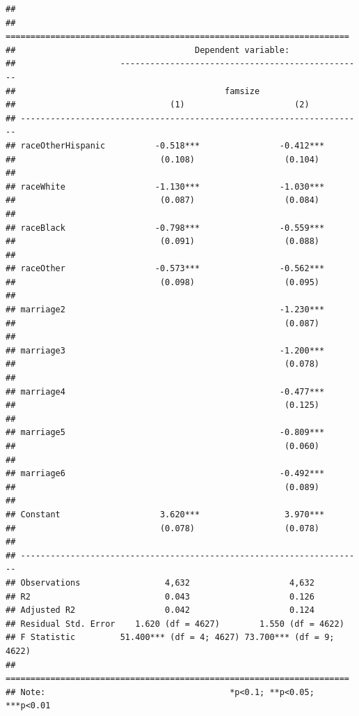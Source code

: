 \documentclass[]{tufte-book}
\theoremstyle{definition}
\theoremstyle{definition}
\theoremstyle{remark}
\begin{document}
\begin{verbatim}
## 
## =====================================================================
##                                    Dependent variable:               
##                     -------------------------------------------------
##                                          famsize                     
##                               (1)                      (2)           
## ---------------------------------------------------------------------
## raceOtherHispanic          -0.518***                -0.412***        
##                             (0.108)                  (0.104)         
##                                                                      
## raceWhite                  -1.130***                -1.030***        
##                             (0.087)                  (0.084)         
##                                                                      
## raceBlack                  -0.798***                -0.559***        
##                             (0.091)                  (0.088)         
##                                                                      
## raceOther                  -0.573***                -0.562***        
##                             (0.098)                  (0.095)         
##                                                                      
## marriage2                                           -1.230***        
##                                                      (0.087)         
##                                                                      
## marriage3                                           -1.200***        
##                                                      (0.078)         
##                                                                      
## marriage4                                           -0.477***        
##                                                      (0.125)         
##                                                                      
## marriage5                                           -0.809***        
##                                                      (0.060)         
##                                                                      
## marriage6                                           -0.492***        
##                                                      (0.089)         
##                                                                      
## Constant                    3.620***                 3.970***        
##                             (0.078)                  (0.078)         
##                                                                      
## ---------------------------------------------------------------------
## Observations                 4,632                    4,632          
## R2                           0.043                    0.126          
## Adjusted R2                  0.042                    0.124          
## Residual Std. Error    1.620 (df = 4627)        1.550 (df = 4622)    
## F Statistic         51.400*** (df = 4; 4627) 73.700*** (df = 9; 4622)
## =====================================================================
## Note:                                     *p<0.1; **p<0.05; ***p<0.01
\end{verbatim}
\end{document}
